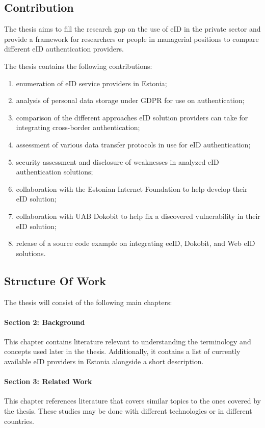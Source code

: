 \subsection{Contribution}

The thesis aims to fill the research gap on the use of eID in the private sector and provide a framework for researchers or people in managerial positions to compare different eID authentication providers.

The thesis contains the following contributions:

\begin{enumerate}
    \item enumeration of eID service providers in Estonia;
    \item analysis of personal data storage under GDPR for use on authentication;
    \item comparison of the different approaches eID solution providers can take for integrating cross-border authentication;
    \item assessment of various data transfer protocols in use for eID authentication;
    \item security assessment and disclosure of weaknesses in analyzed eID authentication solutions;
    \item collaboration with the Estonian Internet Foundation to help develop their eID solution;
    \item collaboration with UAB Dokobit to help fix a discovered vulnerability in their eID solution;
    \item release of a source code example on integrating eeID, Dokobit, and Web eID solutions.
\end{enumerate}

\subsection{Structure Of Work}

The thesis will consist of the following main chapters:

\paragraph{Section 2: Background} This chapter contains literature relevant to understanding the terminology and concepts used later in the thesis. Additionally, it contains a list of currently available eID providers in Estonia alongside a short description.
\paragraph{Section 3: Related Work} This chapter references literature that covers similar topics to the ones covered by the thesis. These studies may be done with different technologies or in different countries.

